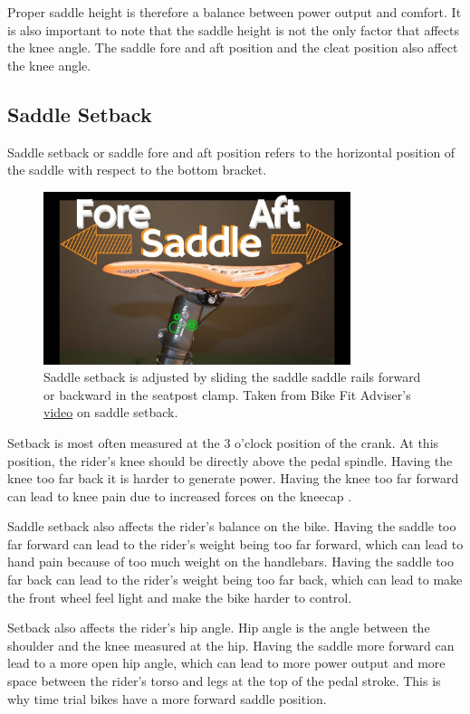 Proper saddle height is therefore a balance between power output and comfort. It is also important to note that the saddle height is not the only factor that affects the knee angle. The saddle fore and aft position and the cleat position also affect the knee angle.

\subsection{Saddle Setback}
Saddle setback or saddle fore and aft position refers to the horizontal position of the saddle with respect to the bottom bracket.

\begin{figure}
    \centering
    \includegraphics[width=0.8\textwidth]{obrazky-figures/saddle_fore_aft.jpg}
    \caption{Saddle setback is adjusted by sliding the saddle saddle rails forward or backward in the seatpost clamp. Taken from Bike Fit Adviser's \href{https://www.youtube.com/watch?app=desktop&v=SZhWVZq2qUc}{video} on saddle setback.}
    \label{fig:saddle_fore_aft}
\end{figure}

Setback is most often measured at the 3 o'clock position of the crank. At this position, the rider's knee should be directly above the pedal spindle. Having the knee too far back it is harder to generate power. Having the knee too far forward can lead to knee pain due to increased forces on the kneecap \cite{burtbikefit}.

Saddle setback also affects the rider's balance on the bike. Having the saddle too far forward can lead to the rider's weight being too far forward, which can lead to hand pain because of too much weight on the handlebars. Having the saddle too far back can lead to the rider's weight being too far back, which can lead to make the front wheel feel light and make the bike harder to control.

Setback also affects the rider's hip angle. Hip angle is the angle between the shoulder and the knee measured at the hip. Having the saddle more forward can lead to a more open hip angle, which can lead to more power output and more space between the rider's torso and legs at the top of the pedal stroke. This is why time trial bikes have a more forward saddle position.



